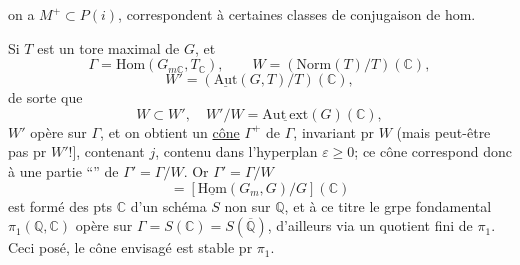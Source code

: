 on a $M^+\subset P(i)$,  correspondent à certaines classes de conjugaison de hom.

Si $T$ est un tore maximal de $G$, et
\[
\Gamma=\mathrm{Hom}(G_{m\mathbb{C}},T_{\mathbb{C}}),\qquad W=(\mathrm{Norm}(T)/T)(\mathbb{C}),
\]
\[
W'=(\underline{\mathrm{Aut}}(G,T)/T)(\mathbb{C}),
\]
de sorte que
\[
W\subset W',\quad W'/W=\underline{\mathrm{Aut\ ext}}(G)(\mathbb{C}),
\]
$W'$ opère sur $\Gamma$, et on obtient un \uline{cône}  $\Gamma^+$ de $\Gamma$, invariant pr $W$ (mais peut-être pas pr $W'$!], contenant $j$, contenu dans l'hyperplan $\varepsilon\geq0$;
 ce cône correspond donc à une partie ``'' de $\Gamma'=\Gamma/W$. Or $\Gamma'=\Gamma/W$
\[
=[\underline{\mathrm{Hom}}(G_m,G)/G](\mathbb{C})
\]
est formé des pts   $\mathbb{C}$ d'un schéma  $S$ non  sur $\mathbb{Q}$, et à ce titre le grpe fondamental $\pi_1(\mathbb{Q},\mathbb{C})$ opère sur  $\Gamma=S(\mathbb{C})=S(\overline{\mathbb{Q}})$, d'ailleurs via un quotient fini de $\pi_1$. Ceci posé, le cône envisagé  est stable pr $\pi_1$.

